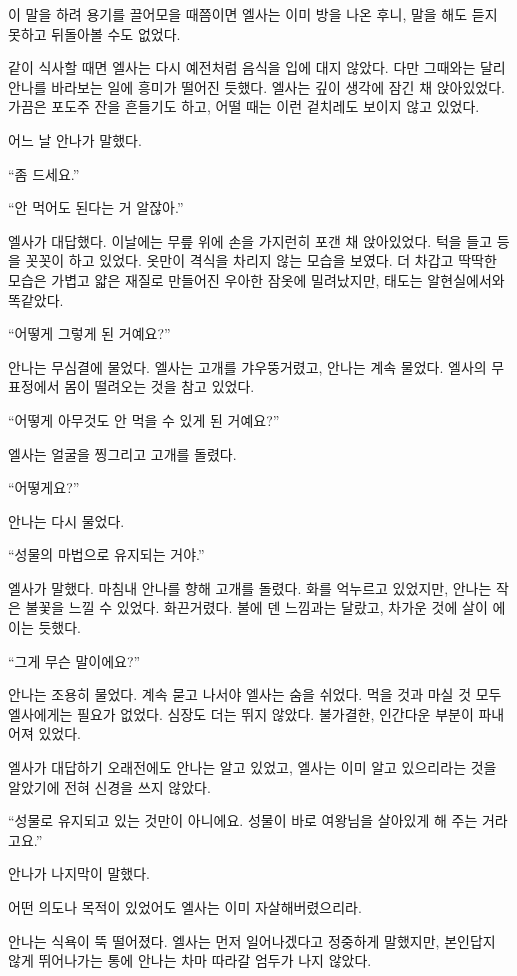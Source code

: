 이 말을 하려 용기를 끌어모을 때쯤이면 엘사는 이미 방을 나온 후니, 말을 해도 듣지 못하고 뒤돌아볼 수도 없었다.

같이 식사할 때면 엘사는 다시 예전처럼 음식을 입에 대지 않았다. 다만 그때와는 달리 안나를 바라보는 일에 흥미가 떨어진 듯했다. 엘사는 깊이 생각에 잠긴 채 앉아있었다. 가끔은 포도주 잔을 흔들기도 하고, 어떨 때는 이런 겉치레도 보이지 않고 있었다.

어느 날 안나가 말했다.

``좀 드세요.''

``안 먹어도 된다는 거 알잖아.''

엘사가 대답했다. 이날에는 무릎 위에 손을 가지런히 포갠 채 앉아있었다. 턱을 들고 등을 꼿꼿이 하고 있었다. 옷만이 격식을 차리지 않는 모습을 보였다. 더 차갑고 딱딱한 모습은 가볍고 얇은 재질로 만들어진 우아한 잠옷에 밀려났지만, 태도는 알현실에서와 똑같았다.

``어떻게 그렇게 된 거예요?''

안나는 무심결에 물었다. 엘사는 고개를 갸우뚱거렸고, 안나는 계속 물었다. 엘사의 무표정에서 몸이 떨려오는 것을 참고 있었다.

``어떻게 아무것도 안 먹을 수 있게 된 거예요?''

엘사는 얼굴을 찡그리고 고개를 돌렸다.

``어떻게요?''

안나는 다시 물었다.

``성물의 마법으로 유지되는 거야.''

엘사가 말했다. 마침내 안나를 향해 고개를 돌렸다. 화를 억누르고 있었지만, 안나는 작은 불꽃을 느낄 수 있었다. 화끈거렸다. 불에 덴 느낌과는 달랐고, 차가운 것에 살이 에이는 듯했다.

``그게 무슨 말이에요?''

안나는 조용히 물었다. 계속 묻고 나서야 엘사는 숨을 쉬었다. 먹을 것과 마실 것 모두 엘사에게는 필요가 없었다. 심장도 더는 뛰지 않았다. 불가결한, 인간다운 부분이 파내어져 있었다.

엘사가 대답하기 오래전에도 안나는 알고 있었고, 엘사는 이미 알고 있으리라는 것을 알았기에 전혀 신경을 쓰지 않았다.

``성물로 유지되고 있는 것만이 아니에요. 성물이 바로 여왕님을 살아있게 해 주는 거라고요.''

안나가 나지막이 말했다.

어떤 의도나 목적이 있었어도 엘사는 이미 자살해버렸으리라.

안나는 식욕이 뚝 떨어졌다. 엘사는 먼저 일어나겠다고 정중하게 말했지만, 본인답지 않게 뛰어나가는 통에 안나는 차마 따라갈 엄두가 나지 않았다.

